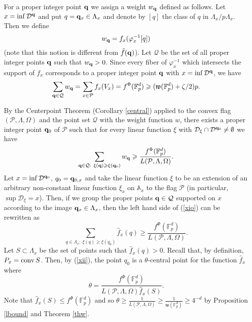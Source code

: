 \documentclass{daj}
\renewcommand{\le}{\leqslant}
\renewcommand{\ge}{\geqslant}
\newcommand{\w}{\mathfrak w}
\newcommand{\A}{\mathbb A}
\newcommand{\FF}{\mathbb F}
\newcommand{\conv}{{\rm conv}\,}
\newcommand{\D}{\mathcal D}
\renewcommand{\P}{\mathcal P}
\theoremstyle{definition}
\theoremstyle{remark}
\theoremstyle{definition}
\theoremstyle{definition}
\begin{document}
For a proper integer point ${\bf q}$ we assign a weight $w_{\bf q}$ defined as follows. Let $x = \inf \D^{\bf q}$ and put $q = {\bf q}_x \in \Lambda_x$ and denote by $[q]$ the class of $q$ in $\Lambda_x/p\Lambda_x$. Then we define
$$
w_{\bf q} = f_x( \varphi_x^{-1}[q] )
$$
(note that this notion is different from $\hat f({\bf q})$). Let $\mathcal Q$ be the set of all proper integer points ${\bf q}$ such that $w_{\bf q} > 0$. 
Since every fiber of $\varphi_x^{-1}$ which intersects the support of $f_x$ corresponds to a proper integer point ${\bf q}$ with $x = \inf \D^{\bf q}$, we have
\begin{equation}\label{weightl}
    \sum_{{\bf q} \in \mathcal Q} w_{\bf q} = \sum_{x \in \P} f_x(V_x) = f^{\Phi}(\FF_p^d) \ge (\w(\FF_p^d) + \zeta/2) p.
\end{equation}

By the Centerpoint Theorem (Corollary \ref{central}) applied to the convex flag $(\P, \Lambda, \Omega)$ and the point set $\mathcal Q$ with the weight function $w$, there exists a proper integer point ${\bf q}_0$ of $\P$ such that for every linear function $\xi$ with $\D_{\xi} \cap \D^{{\bf q}_0} \neq \emptyset$ we have
\begin{equation}\label{xio}
\sum_{{\bf q}\in \mathcal Q:~\xi({\bf q}) \ge \xi({\bf q}_0)} w_{\bf q} \ge \frac{f^{\Phi}(\FF_p^d)}{L(\P, \Lambda, \Omega)}.  
\end{equation}
Let $x = \inf \D^{{\bf q}_0}$, $q_0 = {\bf q}_{0, x}$ and take the linear function $\xi$ to be an extension of an arbitrary non-constant linear function $\xi_x$ on $\A_x$ to the flag $\P$ (in particular, $\sup \D_{\xi} = x$). Then, if we group the proper points ${\bf q}\in \mathcal Q$ supported on $x$ according to the image ${\bf q}_x \in \Lambda_x$, then the left hand side of (\ref{xio}) can be rewritten as 
\begin{equation}\label{xii}
\sum_{q \in \Lambda_x:~ \xi(q) \ge \xi(q_0)} \hat f_x(q) \ge \frac{f^{\Phi}(\FF_p^d)}{L(\P, \Lambda, \Omega)}.    
\end{equation}
Let $S \subset \Lambda_x$ be the set of points such that $\hat f_x(q) > 0$. Recall that, by definition, $P_x = \conv S$. Then, by (\ref{xii}), the point $q_0$ is a $\theta$-central point for the function $\hat f_x$ where 
\begin{equation}\label{theta}
\theta = \frac{f^{\Phi}(\FF_p^d)}{L(\P, \Lambda, \Omega) \hat f_x(S)}.    
\end{equation}
Note that $\hat f_x(S) \le f^{\Phi}(\FF_p^d)$ and so $\theta \ge \frac{1}{L(\P, \Lambda, \Omega)} \ge \frac{1}{\w(\FF_p^d)} \ge 4^{-d}$ by Proposition \ref{lbound} and Theorem \ref{thw}. 
\end{document}
